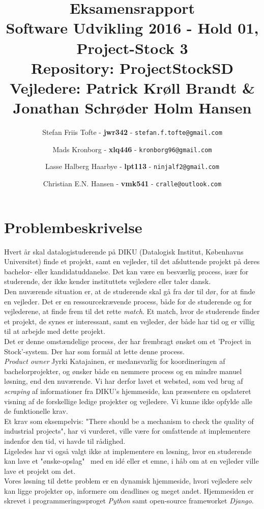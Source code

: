 \documentclass[12pt]{article}
\title{
  \vspace{3cm}
  \Huge{Eksamensrapport} \\
  \Large{Software Udvikling 2016 - Hold 01, Project-Stock 3} \\
  \large{Repository: ProjectStockSD} \\
  \Large{Vejledere: Patrick Krøll Brandt \& Jonathan Schrøder Holm Hansen}
}
\author{
	\Large{Stefan Friis Tofte} - \textbf{jwr342} - \texttt{stefan.f.tofte@gmail.com}
	\and
	\Large{Mads Kronborg} - \textbf{xlq446} - \texttt{kronborg96@gmail.com}
	\and
	\Large{Lasse Halberg Haarbye} - \textbf{lpt113} - \texttt{ninjalf2@gmail.com}
	\and
	\Large{Christian E.N. Hansen} - \textbf{vmk541} - \texttt{cralle@outlook.com}
}
\def \ColourPDF {../include/ku-farve}
\def \TitlePDF {../include/ku-en}  %
\begin{document}


\clearpage\maketitle
\thispagestyle{empty}

\newpage
\tableofcontents
\newpage

\section{Problembeskrivelse}
\label{sec:problem}
Hvert år skal datalogistuderende på DIKU (Datalogisk Institut, Københavns Universitet) finde et projekt, samt en vejleder, til det afsluttende projekt på deres bachelor- eller kandidatuddanelse. Det kan være en besværlig process, især for studerende, der ikke kender instituttets vejledere eller taler dansk.\\
Den nuværende situation er, at de studerende skal gå fra dør til dør, for at finde en vejleder. Det er en ressourcekrævende process, både for de studerende og for vejlederene, at finde frem til det rette \textit{match}. Et match, hvor de studerende finder et projekt, de synes er interessant, samt en vejleder, der både har tid og er villig til at arbejde med dette projekt. \\
Det er denne omstændelige process, der har frembragt ønsket om et 'Project in Stock'-system. Der har som formål at lette denne process. \\
\textit{Product owner} Jyrki Katajainen, er medansvarlig for koordineringen af bachelorprojekter, og ønsker både en nemmere process og en mindre manuel løsning, end den nuværende.
Vi har derfor lavet et websted, som ved brug af \textit{scraping}\cite{scraping} af informationer fra DIKU's hjemmeside, kan præsentere en opdateret visning af de forskellige ledige projekter og vejledere.
Vi kunne ikke opfylde alle de funktionelle krav. \\
Et krav som eksempelvis: "There should be a mechanism to check the quality of industrial projects", har vi vurderet, ville være for omfattende at implementere indenfor den tid, vi havde til rådighed. \\
Ligeledes har vi også valgt ikke at implementere en løsning, hvor en studerende kan lave et "ønske-opslag" \ med en idé eller et emne, i håb om at en vejleder ville lave et projekt om det. \\
Vores løsning til dette problem er en dynamisk hjemmeside, hvori vejledere selv kan ligge projekter op, informere om deadlines og meget andet. Hjemmesiden er skrevet i programmeringssproget \textit{Python} samt open-source frameworket \textit{Django}.
\end{document}
